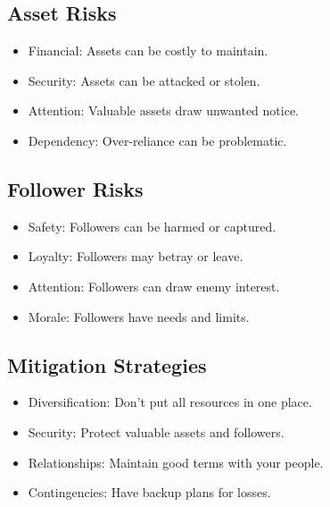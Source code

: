 \documentclass[11pt,twoside,openany]{book}
\begin{document}
\subsection*{Asset Risks}

\begin{itemize}
\item Financial: Assets can be costly to maintain.
\item Security: Assets can be attacked or stolen.
\item Attention: Valuable assets draw unwanted notice.
\item Dependency: Over-reliance can be problematic.
\end{itemize}

\subsection*{Follower Risks}

\begin{itemize}
\item Safety: Followers can be harmed or captured.
\item Loyalty: Followers may betray or leave.
\item Attention: Followers can draw enemy interest.
\item Morale: Followers have needs and limits.
\end{itemize}

\subsection*{Mitigation Strategies}

\begin{itemize}
\item Diversification: Don't put all resources in one place.
\item Security: Protect valuable assets and followers.
\item Relationships: Maintain good terms with your people.
\item Contingencies: Have backup plans for losses.
\end{itemize}
\end{document}
